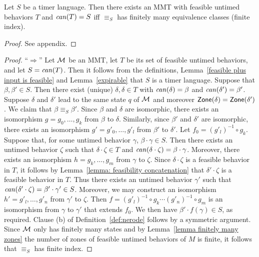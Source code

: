 \begin{theorem}
\label{Myhill Nerode}
Let $S$ be a timer language.
Then there exists an MMT with feasible untimed behaviors $T$ and $\mathit{can}({T}) = S$ iff 
$\equiv_S$ has finitely many equivalence classes (finite index).
\end{theorem}
\ifshort
\begin{proof}
See appendix.
\end{proof}
\else
\begin{proof} 

``$\Rightarrow$'' Let ${\mathcal M}$ be an MMT, let $T$ be its set of feasible untimed behaviors, and let $S = \mathit{can}({T})$.
Then it follows from the definitions, Lemma~\ref{feasible plus input is feasible} and Lemma~\ref{expirable} that $S$ is a timer language.
Suppose that $\beta, \beta' \in S$.
Then there exist (unique) $\delta, \delta \in T$ with
$\mathit{can}({\delta})=\beta$ and $\mathit{can}({\delta'})=\beta'$.
Suppose $\delta$ and $\delta'$ lead to the same state $q$ of ${\mathcal M}$ and moreover $\mathsf{Zone}({\delta}) = \mathsf{Zone}({\delta'})$.
We claim that $\beta \equiv_S \beta'$.
Since $\beta$ and $\delta$ are isomorphic, there exists an isomorphism $g = g_0 ,\ldots, g_k$ from $\beta$ to $\delta$.
Similarly, since $\beta'$ and $\delta'$ are isomorphic, there exists an isomorphism $g' = g'_0 ,\ldots, g'_l$ from $\beta'$ to $\delta'$.
Let $f_0 = (g'_l)^{-1} \circ g_k$.
Suppose that, for some untimed behavior $\gamma$, $\beta \cdot \gamma \in S$.
Then there exists an untimed behavior $\zeta$ such that $\delta \cdot \zeta \in T$ and $\mathit{can}({\delta \cdot \zeta}) = \beta \cdot \gamma$.
Moreover, there exists an isomorphism $h = g_k ,\ldots, g_m$ from $\gamma$ to $\zeta$.
Since $\delta \cdot \zeta$ is a feasible behavior in $T$, it follows by Lemma~\ref{lemma: feasibility concatenation} that
$\delta' \cdot \zeta$ is a feasible behavior in $T$.
Thus there exists an untimed behavior $\gamma'$ such that $\mathit{can}({\delta' \cdot \zeta}) = \beta' \cdot \gamma' \in S$.
Moreover, we may construct an isomorphism $h' = g'_l ,\ldots, g'_n$ from $\gamma'$ to $\zeta$.
Then $f = (g'_l)^{-1} \circ g_k \cdots (g'_n)^{-1} \circ g_m$ is an isomorphism from $\gamma$ to $\gamma'$ that extends $f_0$.
We then have $\beta' \cdot f(\gamma) \in S$, as required.
Clause (b) of Definition~\ref{def:nerode} follows by a symmetric argument.
Since ${\mathcal M}$ only has finitely many states and by Lemma~\ref{lemma finitely many zones} the number of zones of feasible
untimed behaviors of $M$ is finite, it follows that $\equiv_S$ has finite index.


\end{proof}
